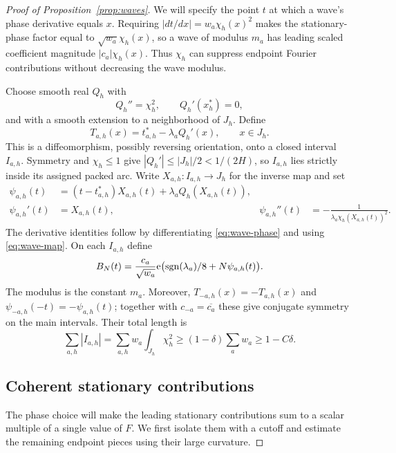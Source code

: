 \begin{proof}[Proof of Proposition~\ref{prop:waves}]
We will specify the point $t$ at which a wave's phase derivative equals
$x$.  Requiring $|dt/dx|=w_a\chi_h(x)^2$ makes the stationary-phase
factor equal to $\sqrt{w_a}\chi_h(x)$, so a wave of modulus $m_a$ has
leading scaled coefficient magnitude $|c_a|\chi_h(x)$.  Thus $\chi_h$ can
suppress endpoint Fourier contributions without decreasing the wave
modulus.

Choose smooth real $Q_h$ with
\[
 Q_h''=\chi_h^2,\qquad Q_h'(x_h^*)=0,
\]
and with a smooth extension to a neighborhood of $J_h$.  Define
\begin{equation}\label{eq:wave-map}
 T_{a,h}(x)=t^*_{a,h}-\lambda_aQ_h'(x),\qquad x\in J_h.
\end{equation}
This is a diffeomorphism, possibly reversing orientation, onto a closed
interval $I_{a,h}$.  Symmetry and $\chi_h\le1$ give
$|Q_h'|\le |J_h|/2<1/(2H)$, so $I_{a,h}$ lies strictly inside its assigned
packed arc.  Write $X_{a,h}:I_{a,h}\to J_h$ for the inverse map and set
\begin{align}
 \psi_{a,h}(t)
 &= (t-t^*_{a,h})X_{a,h}(t)
       +\lambda_a Q_h(X_{a,h}(t)),\label{eq:wave-phase}\\
 \psi_{a,h}'(t)&=X_{a,h}(t),&
 \psi_{a,h}''(t)&=-\frac1{\lambda_a\chi_h(X_{a,h}(t))^2}.
 \label{eq:wave-phase-derivatives}
\end{align}
The derivative identities follow by differentiating
\eqref{eq:wave-phase} and using \eqref{eq:wave-map}.
On each $I_{a,h}$ define
\begin{equation}\label{eq:main-wave}
 B_N(t)=\frac{c_a}{\sqrt{w_a}}
 \mathrm e\bigl(\operatorname{sgn}(\lambda_a)/8+N\psi_{a,h}(t)\bigr).
\end{equation}
The modulus is the constant $m_a$.  Moreover,
$T_{-a,h}(x)=-T_{a,h}(x)$ and
$\psi_{-a,h}(-t)=-\psi_{a,h}(t)$; together with
$c_{-a}=\overline{c_a}$ these give conjugate symmetry on the main intervals.
Their total length is
\begin{equation}\label{eq:main-coverage}
 \sum_{a,h}|I_{a,h}|
 =\sum_{a,h}w_a\int_{J_h}\chi_h^2
 \ge(1-\delta)\sum_aw_a\ge1-C\delta.
\end{equation}

\subsection*{Coherent stationary contributions}

The phase choice will make the leading stationary contributions sum to a
scalar multiple of a single value of $F$.  We first isolate them with a
cutoff and estimate the remaining endpoint pieces using their large
curvature.


\end{proof}
